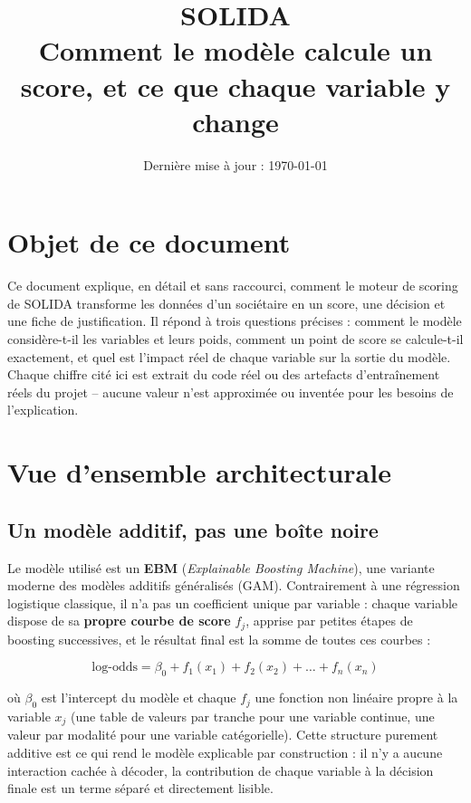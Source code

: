 \documentclass[11pt,a4paper]{article}
\title{\textcolor{solidateal}{\Huge SOLIDA} \\[0.3em] \Large Comment le modèle calcule un score, et ce que chaque variable y change}
\author{}
\date{Dernière mise à jour : \today}
\begin{document}
\maketitle

\section*{Objet de ce document}

Ce document explique, en détail et sans raccourci, comment le moteur de scoring de SOLIDA
transforme les données d'un sociétaire en un score, une décision et une fiche de justification.
Il répond à trois questions précises : comment le modèle considère-t-il les variables et leurs
poids, comment un point de score se calcule-t-il exactement, et quel est l'impact réel de chaque
variable sur la sortie du modèle. Chaque chiffre cité ici est extrait du code réel ou des
artefacts d'entraînement réels du projet -- aucune valeur n'est approximée ou inventée pour les
besoins de l'explication.

\tableofcontents

\section{Vue d'ensemble architecturale}

\subsection{Un modèle additif, pas une boîte noire}

Le modèle utilisé est un \textbf{EBM} (\emph{Explainable Boosting Machine}), une variante moderne
des modèles additifs généralisés (GAM). Contrairement à une régression logistique classique, il
n'a pas un coefficient unique par variable : chaque variable dispose de sa \textbf{propre courbe
de score} $f_j$, apprise par petites étapes de boosting successives, et le résultat final est la
somme de toutes ces courbes :

\begin{equation}
\text{log-odds} = \beta_0 + f_1(x_1) + f_2(x_2) + \dots + f_n(x_n)
\end{equation}

où $\beta_0$ est l'intercept du modèle et chaque $f_j$ une fonction non linéaire propre à la
variable $x_j$ (une table de valeurs par tranche pour une variable continue, une valeur par
modalité pour une variable catégorielle). Cette structure purement additive est ce qui rend le
modèle explicable par construction : il n'y a aucune interaction cachée à décoder, la contribution
de chaque variable à la décision finale est un terme séparé et directement lisible.
\end{document}
